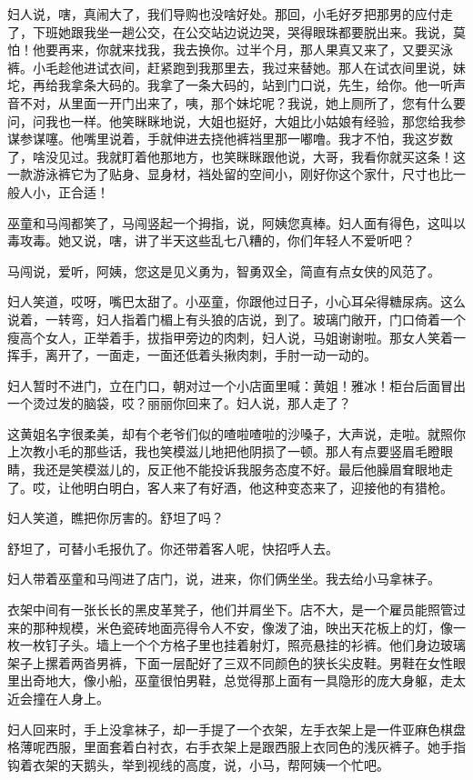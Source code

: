 \documentclass[lang=cn,newtx,12pt,scheme=chinese]{elegantbook}
\begin{document}
妇人说，嗐，真闹大了，我们导购也没啥好处。那回，小毛好歹把那男的应付走了，下班她跟我坐一趟公交，在公交站边说边哭，哭得眼珠都要脱出来。我说，莫怕！他要再来，你就来找我，我去换你。过半个月，那人果真又来了，又要买泳裤。小毛趁他进试衣间，赶紧跑到我那里去，我过来替她。那人在试衣间里说，妹坨，再给我拿条大码的。我拿了一条大码的，站到门口说，先生，给你。他一听声音不对，从里面一开门出来了，咦，那个妹坨呢？我说，她上厕所了，您有什么要问，问我也一样。他笑眯眯地说，大姐也挺好，大姐比小姑娘有经验，那您给我参谋参谋噻。他嘴里说着，手就伸进去挠他裤裆里那一嘟噜。我才不怕，我这岁数了，啥没见过。我就盯着他那地方，也笑眯眯跟他说，大哥，我看你就买这条！这一款游泳裤它为了贴身、显身材，裆处留的空间小，刚好你这个家什，尺寸也比一般人小，正合适！

巫童和马闯都笑了，马闯竖起一个拇指，说，阿姨您真棒。妇人面有得色，这叫以毒攻毒。她又说，嗐，讲了半天这些乱七八糟的，你们年轻人不爱听吧？

马闯说，爱听，阿姨，您这是见义勇为，智勇双全，简直有点女侠的风范了。

妇人笑道，哎呀，嘴巴太甜了。小巫童，你跟他过日子，小心耳朵得糖尿病。这么说着，一转弯，妇人指着门楣上有头狼的店说，到了。玻璃门敞开，门口倚着一个瘦高个女人，正举着手，拔指甲旁边的肉刺，妇人说，马姐谢谢啦。那女人笑着一挥手，离开了，一面走，一面还低着头揪肉刺，手肘一动一动的。

妇人暂时不进门，立在门口，朝对过一个小店面里喊：黄姐！雅冰！柜台后面冒出一个烫过发的脑袋，哎？丽丽你回来了。妇人说，那人走了？

这黄姐名字很柔美，却有个老爷们似的喳啦喳啦的沙嗓子，大声说，走啦。就照你上次教小毛的那些话，我也笑模滋儿地把他阴损了一顿。那人有点要竖眉毛瞪眼睛，我还是笑模滋儿的，反正他不能投诉我服务态度不好。最后他臊眉耷眼地走了。哎，让他明白明白，客人来了有好酒，他这种变态来了，迎接他的有猎枪。

妇人笑道，瞧把你厉害的。舒坦了吗？

舒坦了，可替小毛报仇了。你还带着客人呢，快招呼人去。

妇人带着巫童和马闯进了店门，说，进来，你们俩坐坐。我去给小马拿袜子。

衣架中间有一张长长的黑皮革凳子，他们并肩坐下。店不大，是一个雇员能照管过来的那种规模，米色瓷砖地面亮得令人不安，像泼了油，映出天花板上的灯，像一枚一枚钉子头。墙上一个个方格子里也挂着射灯，照亮悬挂的衫裤。他们身边玻璃架子上摞着两沓男裤，下面一层配好了三双不同颜色的狭长尖皮鞋。男鞋在女性眼里出奇地大，像小船，巫童很怕男鞋，总觉得那上面有一具隐形的庞大身躯，走太近会撞在人身上。

妇人回来时，手上没拿袜子，却一手提了一个衣架，左手衣架上是一件亚麻色棋盘格薄呢西服，里面套着白衬衣，右手衣架上是跟西服上衣同色的浅灰裤子。她手指钩着衣架的天鹅头，举到视线的高度，说，小马，帮阿姨一个忙吧。
\end{document}
